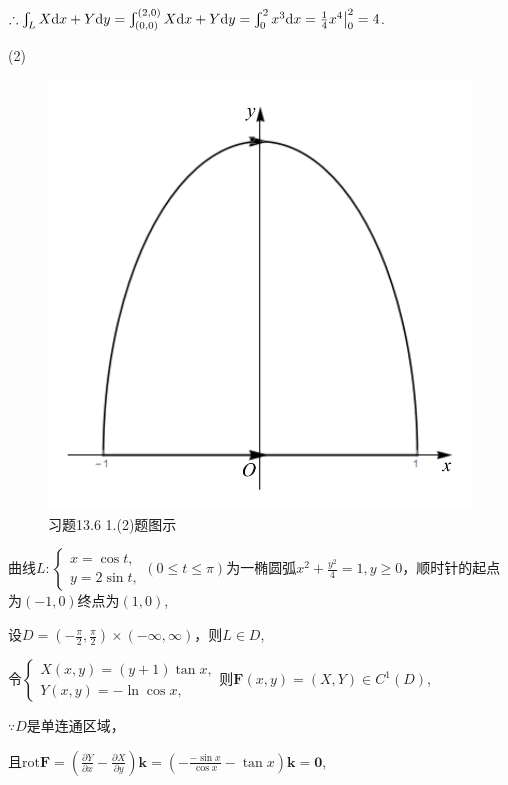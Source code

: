 \documentclass[12pt,UTF8,fleqn]{ctexart}
\newcommand{\Int}[4]{\varint\nolimits_{#1}^{#2}#3\mathrm d#4}
\newcommand{\BLInt}[2]{\varint\nolimits_{#1}#2}
\newcommand{\md}[1]{\mathrm d#1}
\newcommand{\pp}[2]{\frac{\partial #1}{\partial #2}}
\begin{document}
\begin{enumerate}
$\therefore\BLInt L{X\md x+Y\md y}=\varint_{(0,0)}^{(2,0)}{X\md x+Y\md y}=\Int02{x^3}x=\frac14x^4\big|_0^2=4$.

(2)\begin{figure}[H]
\begin{center}
\includegraphics[height=0.3\textheight]{Figures25/Fig13-6-1-2.pdf}
\end{center}
\caption{习题13.6 1.(2)题图示}
\label{13-6-1-2}
\end{figure}

曲线$L:\begin{cases}
x=\cos t,\\
y=2\sin t,
\end{cases}(0\leqslant t\leqslant\pi)$为一椭圆弧$x^2+\frac{y^2}4=1,y\geqslant0$，顺时针的起点为$(-1,0)$终点为$(1,0)$,

设$D=(-\frac\pi2,\frac\pi2)\times(-\infty,\infty)$，则$L\in D$,

令$\begin{cases}
X(x,y)=(y+1)\tan x,\\
Y(x,y)=-\ln\cos x,
\end{cases}$则$\bm F(x,y)=(X,Y)\in C^1(D)$,

$\because D$是单连通区域，

且$\text{rot}\bm F=(\pp Yx-\pp Xy)\bm k=(-\frac{-\sin x}{\cos x}-\tan x)\bm k=\bm0$,


\end{enumerate}
\end{document}
